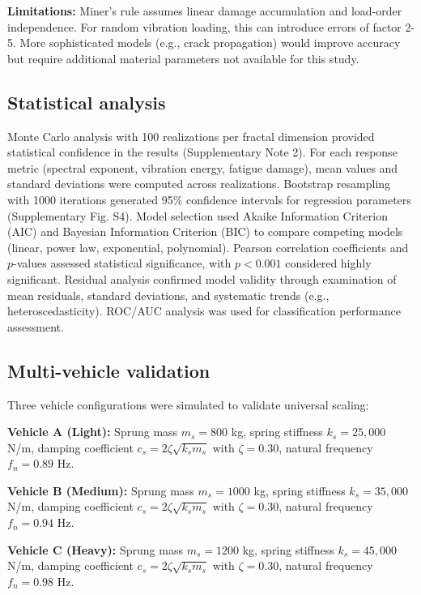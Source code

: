 \documentclass[11pt,letterpaper]{article}
\begin{document}
\textbf{Limitations:} Miner's rule assumes linear damage accumulation and load-order independence. For random vibration loading, this can introduce errors of factor 2-5. More sophisticated models (e.g., crack propagation) would improve accuracy but require additional material parameters not available for this study.

\subsection{Statistical analysis}

Monte Carlo analysis with 100 realizations per fractal dimension provided statistical confidence in the results (Supplementary Note 2). For each response metric (spectral exponent, vibration energy, fatigue damage), mean values and standard deviations were computed across realizations. Bootstrap resampling with 1000 iterations generated 95\% confidence intervals for regression parameters\cite{Efron1993} (Supplementary Fig. S4). Model selection used Akaike Information Criterion (AIC) and Bayesian Information Criterion (BIC) to compare competing models (linear, power law, exponential, polynomial). Pearson correlation coefficients and $p$-values assessed statistical significance, with $p < 0.001$ considered highly significant. Residual analysis confirmed model validity through examination of mean residuals, standard deviations, and systematic trends (e.g., heteroscedasticity). ROC/AUC analysis\cite{Fawcett2006} was used for classification performance assessment.

\subsection{Multi-vehicle validation}

Three vehicle configurations were simulated to validate universal scaling:

\textbf{Vehicle A (Light):} Sprung mass $m_s = 800$ kg, spring stiffness $k_s = 25{,}000$ N/m, damping coefficient $c_s = 2\zeta\sqrt{k_s m_s}$ with $\zeta = 0.30$, natural frequency $f_n = 0.89$ Hz.

\textbf{Vehicle B (Medium):} Sprung mass $m_s = 1000$ kg, spring stiffness $k_s = 35{,}000$ N/m, damping coefficient $c_s = 2\zeta\sqrt{k_s m_s}$ with $\zeta = 0.30$, natural frequency $f_n = 0.94$ Hz.

\textbf{Vehicle C (Heavy):} Sprung mass $m_s = 1200$ kg, spring stiffness $k_s = 45{,}000$ N/m, damping coefficient $c_s = 2\zeta\sqrt{k_s m_s}$ with $\zeta = 0.30$, natural frequency $f_n = 0.98$ Hz.
\end{document}
